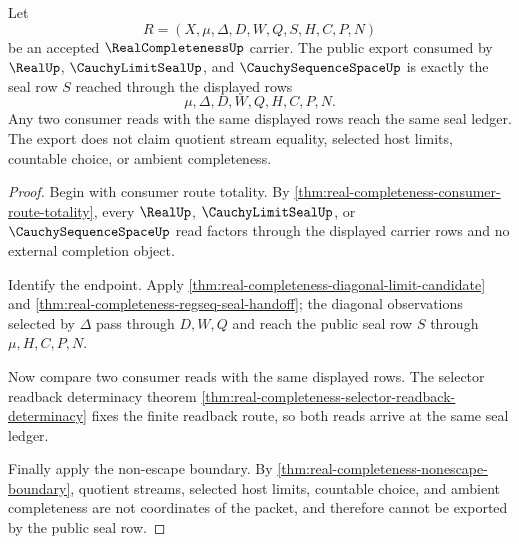 \begin{theorem}
\label{thm:real-completeness-public-seal-export}
Let
$$
R=(X,\mu,\Delta,D,W,Q,S,H,C,P,N)
$$
be an accepted $\RealCompletenessUp$ carrier. The public export consumed by $\RealUp$, $\CauchyLimitSealUp$, and $\CauchySequenceSpaceUp$ is exactly the seal row $S$ reached through the displayed rows
$$
\mu,\Delta,D,W,Q,H,C,P,N.
$$
Any two consumer reads with the same displayed rows reach the same seal ledger. The export does not claim quotient stream equality, selected host limits, countable choice, or ambient completeness.
\end{theorem}
\begin{proof}
Begin with consumer route totality. By \autoref{thm:real-completeness-consumer-route-totality}, every $\RealUp$, $\CauchyLimitSealUp$, or $\CauchySequenceSpaceUp$ read factors through the displayed carrier rows and no external completion object.

Identify the endpoint. Apply \autoref{thm:real-completeness-diagonal-limit-candidate} and \autoref{thm:real-completeness-regseq-seal-handoff}; the diagonal observations selected by $\Delta$ pass through $D,W,Q$ and reach the public seal row $S$ through $\mu,H,C,P,N$.

Now compare two consumer reads with the same displayed rows. The selector readback determinacy theorem \autoref{thm:real-completeness-selector-readback-determinacy} fixes the finite readback route, so both reads arrive at the same seal ledger.

Finally apply the non-escape boundary. By \autoref{thm:real-completeness-nonescape-boundary}, quotient streams, selected host limits, countable choice, and ambient completeness are not coordinates of the packet, and therefore cannot be exported by the public seal row.
\end{proof}

